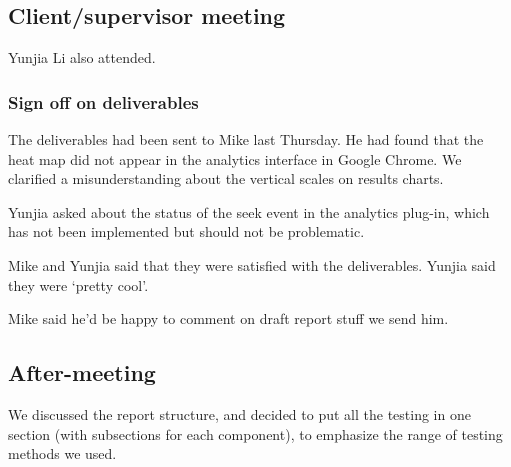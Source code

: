 \subsection{Client/supervisor meeting}

Yunjia Li also attended.

\subsubsection{Sign off on deliverables}

The deliverables had been sent to Mike last Thursday. He had found that
the heat map did not appear in the analytics interface in Google Chrome.
We clarified a misunderstanding about the vertical scales on results
charts.

Yunjia asked about the status of the seek event in the analytics
plug-in, which has not been implemented but should not be problematic.

Mike and Yunjia said that they were satisfied with the deliverables.
Yunjia said they were `pretty cool'.

Mike said he'd be happy to comment on draft report stuff we send him.

\subsection{After-meeting}

We discussed the report structure, and decided to put all the testing in
one section (with subsections for each component), to emphasize the
range of testing methods we used.
